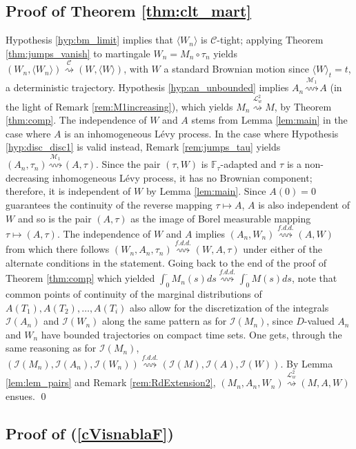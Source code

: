 \documentclass[final]{amsart}
\theoremstyle{definition}
\numberwithin{equation}{section}
\def\crochet#1{\langle #1 \rangle}
\newcommand{\cI}{\ensuremath{\mathcal{I}}}
\newcommand{\cL}{\ensuremath{\mathcal{L}}}
\begin{document}
\subsection{Proof of Theorem \ref{thm:clt_mart}}\label{pf:clt_mart}
Hypothesis \ref{hyp:bm_limit} implies that $\crochet{ W_n }$ is $\mathcal{C}$-tight;
applying Theorem \ref{thm:jumps_vanish} to martingale $W_n = M_n\circ \tau_n$ yields
$(W_n, \crochet{ W_n } ) \stackrel{\mathcal{C}}{\rightsquigarrow} (W,\crochet{ W } )$,
with $W$ a standard Brownian motion since $\crochet{ W }_t=t$, a deterministic trajectory.
Hypothesis \ref{hyp:an_unbounded} implies $A_n \stackrel{\mathcal{M}_1}{\rightsquigarrow} A$
(in the light of Remark \ref{rem:M1increasing}), which yields $M_n \stackrel{\cL^2_w}{\rightsquigarrow} M$,
by Theorem \ref{thm:comp}.
The independence of $W$ and $A$ stems from Lemma \ref{lem:main} in the case where $A$ is an inhomogeneous L\'evy process.
In the case where Hypothesis \ref{hyp:disc_disc1} is valid instead, Remark \ref{rem:jumps_tau} yields
$(A_n,\tau_n) \stackrel{\mathcal{M}_1}{\rightsquigarrow} (A,\tau)$. Since the pair $(\tau,W)$ is
$\mathbb{F}_{\tau}$-adapted and $\tau$ is a non-decreasing inhomogeneous L\'evy process, it has no Brownian component;
therefore, it is independent of $W$ by Lemma \ref{lem:main}. Since $A(0)=0$ guarantees the continuity of the reverse mapping
$\tau\mapsto A$, $A$ is also independent of $W$ and so is the pair $(A,\tau)$ as the image of Borel measurable mapping
$\tau\mapsto(A,\tau)$.
The independence of $W$ and $A$ implies $(A_n,W_n) \stackrel{f.d.d.}{\rightsquigarrow} (A,W)$
from which there follows $(W_n,A_n,\tau_n)  \stackrel{f.d.d.}{\rightsquigarrow} (W,A,\tau)$
under either of the alternate conditions in the statement.
Going back to the end of the proof of Theorem \ref{thm:comp} which yielded
$\int_0^\cdot  M_n(s)ds \stackrel{f.d.d.}{\rightsquigarrow} \int_0^\cdot  M(s)ds$, note that
common points of continuity of the marginal distributions of $A(T_1),A(T_2),\ldots,A(T_i)$
also allow for the discretization of the integrals $\cI(A_n)$ and $\cI(W_n)$ along the same pattern as
for $\cI(M_n) $, since $D$-valued $A_n$ and $W_n$ have bounded trajectories on compact time sets.
One gets, through the same reasoning as for $\cI(M_n) $,
$\left( \cI(M_n) , \cI(A_n) ,  \cI(W_n) \right ) \stackrel{f.d.d.}{\rightsquigarrow}
\left( \cI(M) , \cI(A) ,  \cI(W) \right )$.
By Lemma \ref{lem:lem_pairs} and Remark \ref{rem:RdExtension2},
$(M_n,A_n,W_n) \stackrel{\cL^2_w}{\rightsquigarrow} (M,A,W)$ ensues.
\qed

\subsection{Proof of (\ref{cVisnablaF})}\label{pf:cVisnablaF}
\end{document}
